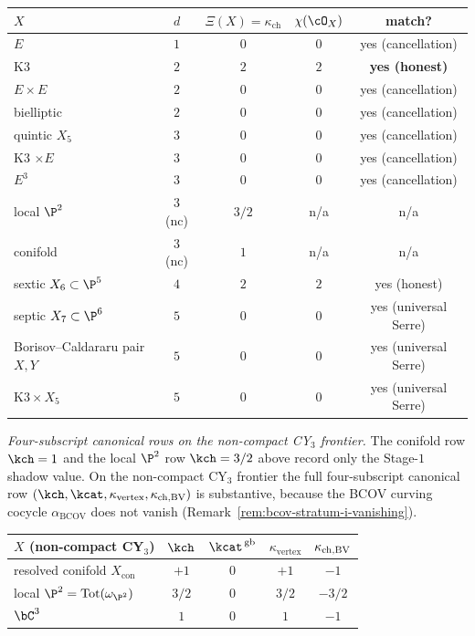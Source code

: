\begin{center}
\begin{tabular}{lcccc}
\toprule
$X$ & $d$ & $\Xi(X) = \kappa_{\mathrm{ch}}$ & $\chi(\cO_X)$ & match? \\
\midrule
$E$ & $1$ & $0$ & $0$ & yes (cancellation) \\
K3 & $2$ & $2$ & $2$ & \textbf{yes (honest)} \\
$E \times E$ & $2$ & $0$ & $0$ & yes (cancellation) \\
bielliptic & $2$ & $0$ & $0$ & yes (cancellation) \\
quintic $X_5$ & $3$ & $0$ & $0$ & yes (cancellation) \\
K3 $\times E$ & $3$ & $0$ & $0$ & yes (cancellation) \\
$E^3$ & $3$ & $0$ & $0$ & yes (cancellation) \\
local $\P^2$ & $3$ (nc) & $3/2$ & n/a & n/a \\
conifold & $3$ (nc) & $1$ & n/a & n/a \\
sextic $X_6 \subset \P^5$ & $4$ & $2$ & $2$ & yes (honest) \\
septic $X_7 \subset \P^6$ & $5$ & $0$ & $0$ & yes (universal Serre) \\
Borisov--Caldararu pair $X, Y$ & $5$ & $0$ & $0$ & yes (universal Serre) \\
$\mathrm{K3} \times X_5$ & $5$ & $0$ & $0$ & yes (universal Serre) \\
\bottomrule
\end{tabular}
\end{center}

\emph{Four-subscript canonical rows on the non-compact CY$_3$ frontier.}
The conifold row $\kch = 1$ and the local $\P^2$ row $\kch = 3/2$ above
record only the Stage-$1$ shadow value. On the non-compact CY$_3$
frontier the full four-subscript canonical row
$(\kch, \kcat, \kappa_{\mathrm{vertex}}, \kchBV)$ is substantive, because the BCOV
curving cocycle $\alpha_{\mathrm{BCOV}}$ does not vanish
(Remark~\ref{rem:bcov-stratum-i-vanishing}).

\begin{center}
\begin{tabular}{lcccc}
\toprule
$X$ (non-compact CY$_3$) & $\kch$ & $\kcat^{\,\mathrm{gb}}$ & $\kappa_{\mathrm{vertex}}$ & $\kappa_{\mathrm{ch,BV}}$ \\
\midrule
resolved conifold $X_{\mathrm{con}}$ & $+1$ & $0$ & $+1$ & $-1$ \\
local $\P^2 = \mathrm{Tot}(\omega_{\P^2})$ & $3/2$ & $0$ & $3/2$ & $-3/2$ \\
$\bC^3$ & $1$ & $0$ & $1$ & $-1$ \\
\bottomrule
\end{tabular}
\end{center}

